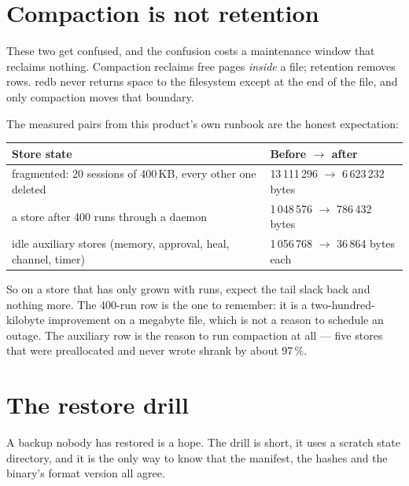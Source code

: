 \section{Compaction is not retention}

These two get confused, and the confusion costs a maintenance window that reclaims nothing.
Compaction reclaims free pages \emph{inside} a file; retention removes rows. redb never
returns space to the filesystem except at the end of the file, and only compaction moves
that boundary.

The measured pairs from this product's own runbook are the honest expectation:

\begin{center}
\begin{tabular}{@{}p{}p{}@{}}
	\toprule
	\textbf{Store state} & \textbf{Before $\rightarrow$ after} \\
	\midrule
	fragmented: 20 sessions of 400\,KB, every other one deleted &
	13\,111\,296 $\rightarrow$ 6\,623\,232 bytes \\
	a store after 400 runs through a daemon & 1\,048\,576 $\rightarrow$ 786\,432 bytes \\
	idle auxiliary stores (memory, approval, heal, channel, timer) &
	1\,056\,768 $\rightarrow$ 36\,864 bytes each \\
	\bottomrule
\end{tabular}
\end{center}

So on a store that has only grown with runs, expect the tail slack back and nothing more.
The 400-run row is the one to remember: it is a two-hundred-kilobyte improvement on a
megabyte file, which is not a reason to schedule an outage. The auxiliary row is the reason
to run compaction at all --- five stores that were preallocated and never wrote shrank by
about 97\,\%.

\section{The restore drill}

A backup nobody has restored is a hope. The drill is short, it uses a scratch state
directory, and it is the only way to know that the manifest, the hashes and the binary's
format version all agree.

